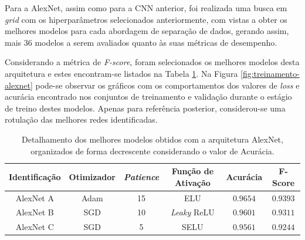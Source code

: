 
Para a AlexNet, assim como para a CNN anterior, foi realizada uma busca em \emph{grid} com os hiperparâmetros selecionados anteriormente, com vistas a obter os melhores modelos para cada abordagem de separação de dados, gerando assim, mais $36$ modelos a serem avaliados quanto às suas métricas de desempenho.

Considerando a métrica de \emph{F-score}, foram selecionados os melhores modelos  desta arquitetura e estes encontram-se listados na Tabela \ref{tab:alexnet}. Na Figura \ref{fig:treinamento-alexnet} pode-se observar os gráficos com os comportamentos dos valores de \emph{loss} e acurácia encontrado nos conjuntos de treinamento e validação durante o estágio de treino destes modelos. Apenas para referência posterior, considerou-se uma rotulação das melhores redes identificadas.

\begin{table}[h!]
\centering
\caption{Detalhamento dos melhores modelos obtidos com a arquitetura AlexNet, organizados de forma decrescente considerando o valor de Acurácia.}
\label{tab:alexnet}
\begin{tabular}{cccccc}
\toprule
\textbf{Identificação} & \textbf{Otimizador} & \textbf{\emph{Patience}}  & \textbf{Função de Ativação} & \textbf{Acurácia} & \textbf{F-Score} \\
\midrule
AlexNet A & Adam & 15 & ELU & $0.9654$ & $0.9393$ \\
AlexNet B & SGD & 10 & \emph{Leaky} ReLU & $0.9601$ & $0.9311$ \\
AlexNet C & SGD & 5 & SELU & $0.9561$ & $0.9244$ \\
\bottomrule
\end{tabular}
\end{table}

